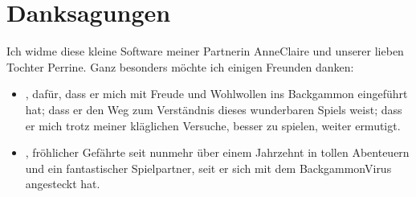 \documentclass[letterpaper,10pt,german]{sphinxmanual}
\begin{document}
\chapter{Danksagungen}
\label{\detokenize{index:remerciements}}
\sphinxAtStartPar
Ich widme diese kleine Software meiner Partnerin Anne\sphinxhyphen{}Claire und unserer lieben Tochter Perrine. Ganz besonders möchte ich einigen Freunden danken:
\begin{itemize}
\item {} 
\sphinxAtStartPar
{}, dafür, dass er mich mit Freude und Wohlwollen ins Backgammon eingeführt hat; dass er den Weg zum Verständnis dieses wunderbaren Spiels weist; dass er mich trotz meiner kläglichen Versuche, besser zu spielen, weiter ermutigt.

\item {} 
\sphinxAtStartPar
{}, fröhlicher Gefährte seit nunmehr über einem Jahrzehnt in tollen Abenteuern und ein fantastischer Spielpartner, seit er sich mit dem Backgammon\sphinxhyphen{}Virus angesteckt hat.

\end{itemize}



\renewcommand{\indexname}{Stichwortverzeichnis}
\printindex
\end{document}

